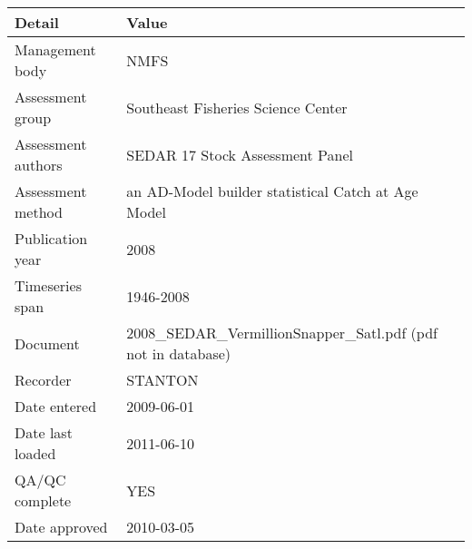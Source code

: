 \begin{table}[htb]
\centering
\begin{tabular}{lp{7cm}}
\toprule
Detail & Value \\
\midrule
Management body    & NMFS                                                           \\
Assessment group   & Southeast Fisheries Science Center                             \\
Assessment authors & SEDAR 17 Stock Assessment Panel                                \\
Assessment method  & an AD-Model builder statistical Catch at Age Model             \\
Publication year   & 2008                                                           \\
Timeseries span    & 1946-2008                                                      \\
Document           & 2008\_SEDAR\_VermillionSnapper\_Satl.pdf (pdf not in database) \\
Recorder           & STANTON                                                        \\
Date entered       & 2009-06-01                                                     \\
Date last loaded   & 2011-06-10                                                     \\
QA/QC complete     & YES                                                            \\
Date approved      & 2010-03-05                                                     \\
\bottomrule
\end{tabular}
\label{tab:assessdet}
\end{table}
